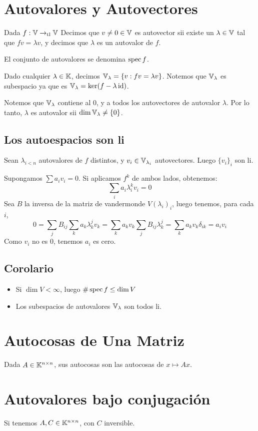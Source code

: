 \documentclass{article}
\begin{document}
\section*{Autovalores y Autovectores}
Dada $f : \mathbb{V} \to_{\operatorname{tl}} \mathbb{V}$ Decimos que $v \neq 0 \in \mathbb{V}$ es autovector sii existe un $\lambda \in \mathbb{V}$ tal que $fv = \lambda v$, y decimos que $\lambda$ es un autovalor de $f$.

El conjunto de autovalores se denomina $\operatorname{spec} f$.

Dado cualquier $\lambda \in \mathbb{K}$, decimos $\mathbb{V}_\lambda = \{v : fv = \lambda v\}$. Notemos que $\mathbb{V}_\lambda$ es subespacio ya que es $\mathbb{V}_\lambda = \ker (f - \lambda \operatorname{id})$.

Notemos que $\mathbb{V}_\lambda$ contiene al $0$, y a todos los autovectores de autovalor $\lambda$. Por lo tanto, $\lambda$ es autovalor sii $\dim \mathbb{V}_\lambda \neq \{0\}$.

\subsection*{Los autoespacios son li}
Sean $\lambda_{i < n}$ autovalores de $f$ distintos, y $v_i \in \mathbb{V}_{\lambda_i}$ autovectores. Luego $\{v_i\}_i$ son li.

Supongamos $\sum a_iv_i = 0$. Si aplicamos $f^k$ de ambos lados, obtenemos:
\[
    \sum_i a_i\lambda_i^kv_i = 0
\]
Sea $B$ la inversa de la matriz de vandermonde $V(\lambda_i)_i$, luego tenemos, para cada $i$,
\[
    0 = \sum_j B_{ij} \sum_k a_k\lambda_{k}^j v_k = \sum_k a_k v_k \sum_j B_{ij} \lambda_k^j = \sum_k a_k v_k \delta_{ik} = a_i v_i
\]
Como $v_i$ no es $0$, tenemos $a_i$ es cero.
\subsection*{Corolario}
\begin{itemize}
    \item
        Si $\dim V < \infty$, luego $\# \operatorname{spec} f \leq \dim V$
    \item Los subespacios de autovalores $\mathbb{V}_\lambda$ son todos li.
\end{itemize}

\section*{Autocosas de Una Matriz}
Dada $A \in \mathbb{K}^{n \times n}$, sus autocosas son las autocosas de $x \mapsto Ax$.

\section*{Autovalores bajo conjugación}
Si tenemos $A, C \in \mathbb{K}^{n \times n}$, con $C$ inversible.
\end{document}

